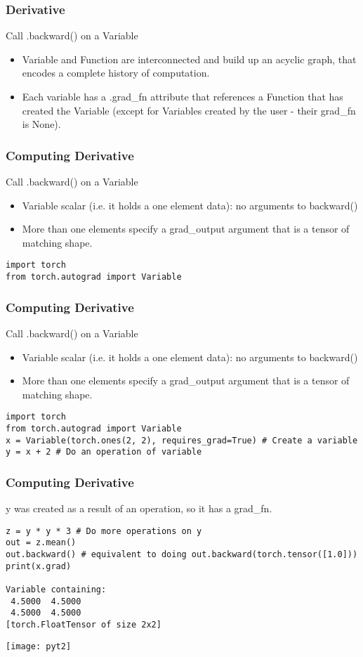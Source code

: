 \begin{frame}[fragile] \frametitle{Derivative}
Call .backward() on a Variable
\begin{itemize}
\item Variable and Function are interconnected and build up an acyclic graph, that encodes a complete history of computation.
\item Each variable has a .grad\_fn attribute that references a Function that has created the Variable (except for Variables created by the user - their grad\_fn is None).
\end{itemize}
\end{frame}

\begin{frame}[fragile] \frametitle{Computing Derivative}
Call .backward() on a Variable
\begin{itemize}
\item Variable scalar (i.e. it holds a one element data): no arguments to backward()
\item More than one elements specify a grad\_output argument that is a tensor of matching shape.
\end{itemize}
\begin{lstlisting}
import torch
from torch.autograd import Variable
\end{lstlisting}
\end{frame}

\begin{frame}[fragile] \frametitle{Computing Derivative}
Call .backward() on a Variable
\begin{itemize}
\item Variable scalar (i.e. it holds a one element data): no arguments to backward()
\item More than one elements specify a grad\_output argument that is a tensor of matching shape.
\end{itemize}
\begin{lstlisting}
import torch
from torch.autograd import Variable
x = Variable(torch.ones(2, 2), requires_grad=True) # Create a variable
y = x + 2 # Do an operation of variable

\end{lstlisting}
\end{frame}


\begin{frame}[fragile] \frametitle{Computing Derivative}
y was created as a result of an operation, so it has a grad\_fn.
\begin{lstlisting}
z = y * y * 3 # Do more operations on y
out = z.mean()
out.backward() # equivalent to doing out.backward(torch.tensor([1.0]))
print(x.grad)

Variable containing:
 4.5000  4.5000
 4.5000  4.5000
[torch.FloatTensor of size 2x2]
\end{lstlisting}
\begin{center}
\texttt{[image: pyt2]}
\end{center}
\end{frame}


